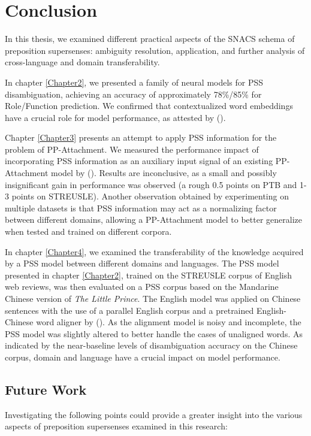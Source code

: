 \chapter{Conclusion}
\label{Conclusions}
In this thesis, we examined different practical aspects of the SNACS schema of preposition supersenses: ambiguity resolution, application, and further analysis of cross-language and domain transferability. 

In chapter \ref{Chapter2}, we presented a family of neural models for PSS disambiguation, achieving an accuracy of approximately 78\%/85\% for Role/Function prediction. We confirmed that contextualized word embeddings have a crucial role for model performance, as attested by (\cite{nelson}). 

Chapter \ref{Chapter3} presents an attempt to apply PSS information for the problem of PP-Attachment. We measured the performance impact of incorporating PSS information as an auxiliary input signal of an existing PP-Attachment model by (\cite{hpcd}). Results are inconclusive, as a small and possibly insignificant gain in performance was observed (a rough 0.5 points on PTB and 1-3 points on STREUSLE). Another observation obtained by experimenting on multiple datasets is that PSS information may act as a normalizing factor between different domains, allowing a PP-Attachment model to better generalize when tested and trained on different corpora. 

In chapter \ref{Chapter4}, we examined the transferability of the knowledge acquired by a PSS model between different domains and languages. The PSS model presented in chapter \ref{Chapter2}, trained on the STREUSLE corpus of English web reviews, was then evaluated on a PSS corpus based on the Mandarine Chinese version of \textit{The Little Prince}. The English model was applied on Chinese sentences with the use of a parallel English corpus and a pretrained English-Chinese word aligner by (\cite{liu2014contrastive}). As the alignment model is noisy and incomplete, the PSS model was slightly altered to better handle the cases of unaligned words. As indicated by the near-baseline levels of disambiguation accuracy on the Chinese corpus, domain and language have a crucial impact on model performance. 

\section{Future Work}

Investigating the following points could provide a greater insight into the various aspects of preposition supersenses examined in this research:

